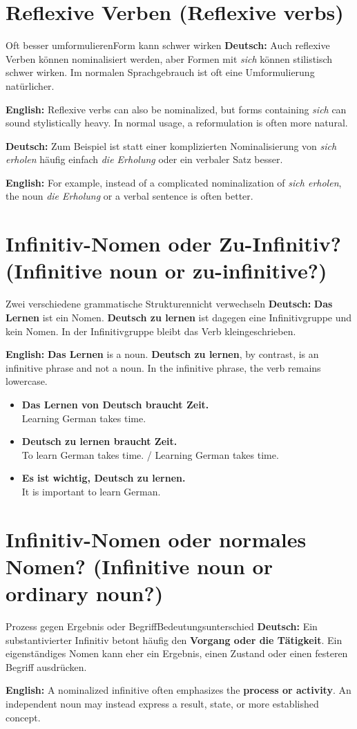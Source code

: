 \documentclass[a4paper,11pt]{article}
\newcommand{\GermanText}[1]{\textbf{Deutsch: }#1\par}
\newcommand{\EnglishText}[1]{{\small\color{SoftGray}\textbf{English: }#1\par}}
\newcommand{\ExampleItem}[2]{\item \textbf{#1}\\{\small\color{SoftGray}#2}}
\begin{document}
\section{Reflexive Verben \textnormal{(Reflexive verbs)}}
\begin{grammarentry}{Oft besser umformulieren}{Form kann schwer wirken}
\GermanText{Auch reflexive Verben können nominalisiert werden, aber Formen mit \textit{sich} können stilistisch schwer wirken. Im normalen Sprachgebrauch ist oft eine Umformulierung natürlicher.}
\EnglishText{Reflexive verbs can also be nominalized, but forms containing \textit{sich} can sound stylistically heavy. In normal usage, a reformulation is often more natural.}

\GermanText{Zum Beispiel ist statt einer komplizierten Nominalisierung von \textit{sich erholen} häufig einfach \textit{die Erholung} oder ein verbaler Satz besser.}
\EnglishText{For example, instead of a complicated nominalization of \textit{sich erholen}, the noun \textit{die Erholung} or a verbal sentence is often better.}
\end{grammarentry}

\section{Infinitiv-Nomen oder Zu-Infinitiv? \textnormal{(Infinitive noun or zu-infinitive?)}}
\begin{grammarentry}{Zwei verschiedene grammatische Strukturen}{nicht verwechseln}
\GermanText{\textbf{Das Lernen} ist ein Nomen. \textbf{Deutsch zu lernen} ist dagegen eine Infinitivgruppe und kein Nomen. In der Infinitivgruppe bleibt das Verb kleingeschrieben.}
\EnglishText{\textbf{Das Lernen} is a noun. \textbf{Deutsch zu lernen}, by contrast, is an infinitive phrase and not a noun. In the infinitive phrase, the verb remains lowercase.}
\end{grammarentry}

\begin{exbox}
\begin{itemize}
\ExampleItem{Das Lernen von Deutsch braucht Zeit.}{Learning German takes time.}
\ExampleItem{Deutsch zu lernen braucht Zeit.}{To learn German takes time. / Learning German takes time.}
\ExampleItem{Es ist wichtig, Deutsch zu lernen.}{It is important to learn German.}
\end{itemize}
\end{exbox}

\section{Infinitiv-Nomen oder normales Nomen? \textnormal{(Infinitive noun or ordinary noun?)}}
\begin{grammarentry}{Prozess gegen Ergebnis oder Begriff}{Bedeutungsunterschied}
\GermanText{Ein substantivierter Infinitiv betont häufig den \textbf{Vorgang oder die Tätigkeit}. Ein eigenständiges Nomen kann eher ein Ergebnis, einen Zustand oder einen festeren Begriff ausdrücken.}
\EnglishText{A nominalized infinitive often emphasizes the \textbf{process or activity}. An independent noun may instead express a result, state, or more established concept.}
\end{grammarentry}
\end{document}
